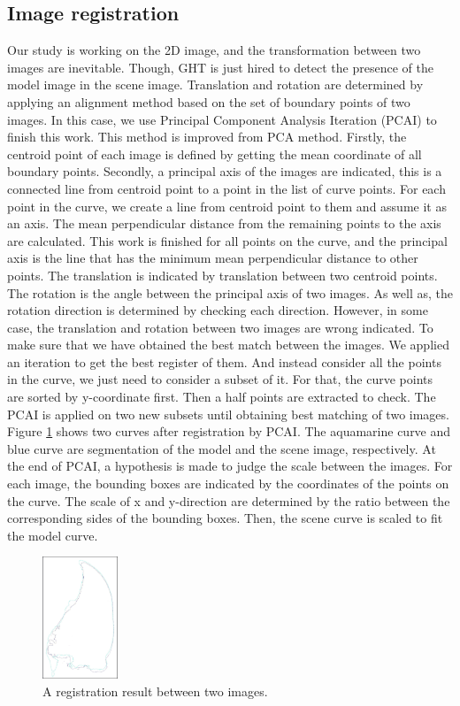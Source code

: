 \documentclass[twoside,twocolumn,10pt]{article}
\begin{document}
\subsection{Image registration}
Our study is working on the 2D image, and the transformation between
two images are inevitable. Though, GHT is just hired to detect the
presence of the model image in the scene image. Translation and
rotation are determined by applying an alignment method based on the
set of boundary points of two images. In this case, we use Principal
Component Analysis Iteration (PCAI) to finish this work. This method
is improved from PCA method\cite{shlens2014tutorial}. Firstly, the centroid point of each image is defined by getting the mean coordinate of all boundary points. Secondly, a principal axis of the images are indicated, this is a connected line from centroid point to a point in the list of curve points. For each point in the curve, we create a line from centroid point to them and assume it as an axis. The mean perpendicular distance from the remaining points to the axis are calculated. This work is finished for all points on the curve, and the principal axis is the line that has the minimum mean perpendicular distance to other points. The translation is
indicated by translation between two centroid points. The rotation is
the angle between the principal axis of two images. As well as, the
rotation direction is determined by checking each direction. However,
in some case, the translation and rotation between two images are
wrong indicated. To make sure that we have obtained the best match
between the images. We applied an iteration to get the best register
of them. And instead consider all the points in the curve, we just
need to consider a subset of it. For that, the curve points are sorted by
y-coordinate first. Then a half points are extracted to check. The
PCAI is applied on two new subsets until obtaining best matching of
two images. Figure \ref{fig:box} shows two curves after registration by PCAI. 
The aquamarine curve and blue curve are segmentation of the model and the scene image, respectively.
At the end of PCAI, a hypothesis is made to judge the scale between the images. For each image, the bounding boxes are indicated by the coordinates of the points on the curve. The scale of x and y-direction are determined by the ratio between the corresponding sides of the bounding boxes. Then, the scene curve is scaled to fit the model curve.
\begin{figure}[htb]
    \centering
    \includegraphics[width=0.2\textwidth]{./images/imreg}
    \caption{A registration result between two images.}
    \label{fig:box}
\end{figure}~\\
\end{document}
